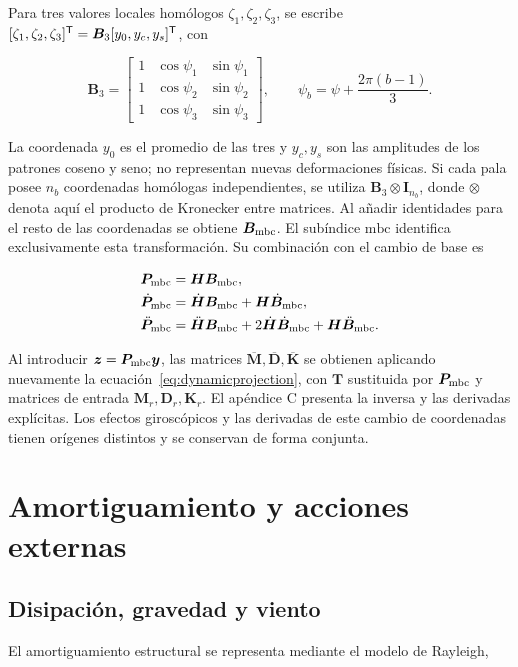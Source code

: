 Para tres valores locales homólogos $\zeta_1,\zeta_2,\zeta_3$, se escribe $[\zeta_1,\zeta_2,\zeta_3]^\mathsf T=\bm B_3[y_0,y_c,y_s]^\mathsf T$, con

\begin{equation}
\bm B_3=\begin{bmatrix}
1&\cos\psi_1&\sin\psi_1\\
1&\cos\psi_2&\sin\psi_2\\
1&\cos\psi_3&\sin\psi_3
\end{bmatrix},\qquad
\psi_b=\psi+\frac{2\pi(b-1)}3.
\end{equation}

La coordenada $y_0$ es el promedio de las tres y $y_c,y_s$ son las amplitudes de los patrones coseno y seno; no representan nuevas deformaciones físicas. Si cada pala posee $n_b$ coordenadas homólogas independientes, se utiliza $\bm B_3\otimes\bm I_{n_b}$, donde $\otimes$ denota aquí el producto de Kronecker entre matrices. Al añadir identidades para el resto de las coordenadas se obtiene $\bm B_{\rm mbc}$. El subíndice $\mathrm{mbc}$ identifica exclusivamente esta transformación. Su combinación con el cambio de base es

\begin{align}
\bm P_{\rm mbc}&=\bm H\bm B_{\rm mbc},\nonumber\\
\dot{\bm P}_{\rm mbc}&=\dot{\bm H}\bm B_{\rm mbc}+\bm H\dot{\bm B}_{\rm mbc},\nonumber\\
\ddot{\bm P}_{\rm mbc}&=\ddot{\bm H}\bm B_{\rm mbc}
+2\dot{\bm H}\dot{\bm B}_{\rm mbc}+\bm H\ddot{\bm B}_{\rm mbc}.
\end{align}

Al introducir $\bm z=\bm P_{\rm mbc}\bm y$, las matrices $\overline{\bm M},\overline{\bm D},\overline{\bm K}$ se obtienen aplicando nuevamente la ecuación~\eqref{eq:dynamicprojection}, con $\bm T$ sustituida por $\bm P_{\rm mbc}$ y matrices de entrada $\bm M_r,\bm D_r,\bm K_r$. El apéndice C presenta la inversa y las derivadas explícitas. Los efectos giroscópicos y las derivadas de este cambio de coordenadas tienen orígenes distintos y se conservan de forma conjunta.

\FloatBarrier
\section{Amortiguamiento y acciones externas}
\subsection{Disipación, gravedad y viento}
El amortiguamiento estructural se representa mediante el modelo de Rayleigh,

